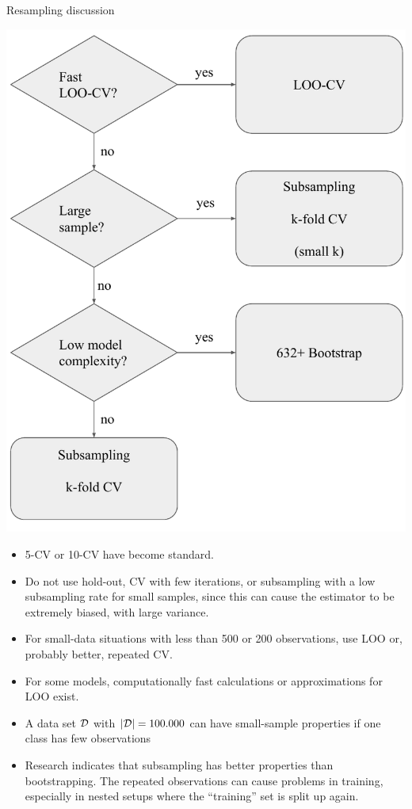 \documentclass[11pt,compress,t,notes=noshow, xcolor=table]{beamer}
\begin{document}
\begin{vbframe}{Resampling discussion}
\framebreak

\fboxsep=0pt
\noindent%
\begin{minipage}[t]{0.42\linewidth}
\vspace{0pt}
\includegraphics{figure_man/resampling_dec_tree}
\end{minipage}%
\hfill%
%
\begin{minipage}[t]{0.58\linewidth}
\vspace{0pt}
\scriptsize
\begin{itemize}
  \item 5-CV or 10-CV have become standard.
  \item Do not use hold-out, CV with few iterations, or subsampling with a low 
  subsampling rate for small samples, since this can cause the estimator to be 
  extremely biased, with large variance.
  \item For small-data situations with less than 500 or 200 observations, use 
  LOO or, probably better, repeated CV.
  \item For some models, computationally fast calculations or approximations 
  for LOO exist.
  \item A data set $\mathcal{D}$ with $|\mathcal{D}| = 100.000$ can have small-sample properties 
  if one class has few observations 
  \item Research indicates that subsampling has better properties than
    bootstrapping. The repeated observations can cause problems in training,
    especially in nested setups where the \enquote{training} set is split up again.
\end{itemize}
\end{minipage}



\end{vbframe}

\endlecture
\end{document}
